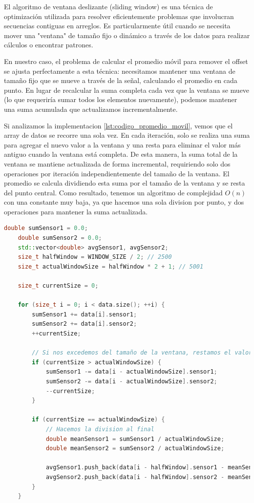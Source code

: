 \documentclass[12pt,a4paper]{article}
\begin{document}
El algoritmo de ventana deslizante (sliding window) es una técnica de optimización utilizada para resolver eficientemente problemas que involucran secuencias contiguas en arreglos. Es particularmente útil cuando se necesita mover una "ventana" de tamaño fijo o dinámico a través de los datos para realizar cálculos o encontrar patrones.

En nuestro caso, el problema de calcular el promedio móvil para remover el offset se ajusta perfectamente a esta técnica: necesitamos mantener una ventana de tamaño fijo que se mueve a través de la señal, calculando el promedio en cada punto. En lugar de recalcular la suma completa cada vez que la ventana se mueve (lo que requeriría sumar todos los elementos nuevamente), podemos mantener una suma acumulada que actualizamos incrementalmente.

Si analizamos la implementacion \ref{lst:codigo_promedio_movil}, vemos que el array de datos se recorre una sola vez. En cada iteración, solo se realiza una suma para agregar el nuevo valor a la ventana y una resta para eliminar el valor más antiguo cuando la ventana está completa. De esta manera, la suma total de la ventana se mantiene actualizada de forma incremental, requiriendo solo dos operaciones por iteración independientemente del tamaño de la ventana. El promedio se calcula dividiendo esta suma por el tamaño de la ventana y se resta del punto central. Como resultado, tenemos un algoritmo de complejidad $O(n)$ con una constante muy baja, ya que hacemos una sola division por punto, y dos operaciones para mantener la suma actualizada.

\begin{lstlisting}[language=C++, label=lst:codigo_promedio_movil]
    double sumSensor1 = 0.0;
    double sumSensor2 = 0.0;
    std::vector<double> avgSensor1, avgSensor2;
    size_t halfWindow = WINDOW_SIZE / 2; // 2500
    size_t actualWindowSize = halfWindow * 2 + 1; // 5001

    size_t currentSize = 0;

    for (size_t i = 0; i < data.size(); ++i) {
        sumSensor1 += data[i].sensor1;
        sumSensor2 += data[i].sensor2;
        ++currentSize;

        // Si nos excedemos del tamaño de la ventana, restamos el valor mas viejo
        if (currentSize > actualWindowSize) {
            sumSensor1 -= data[i - actualWindowSize].sensor1;
            sumSensor2 -= data[i - actualWindowSize].sensor2;
            --currentSize;
        }

        if (currentSize == actualWindowSize) {
            // Hacemos la division al final
            double meanSensor1 = sumSensor1 / actualWindowSize;
            double meanSensor2 = sumSensor2 / actualWindowSize;

            avgSensor1.push_back(data[i - halfWindow].sensor1 - meanSensor1);
            avgSensor2.push_back(data[i - halfWindow].sensor2 - meanSensor2);
        }
    }
\end{lstlisting}
\end{document}
